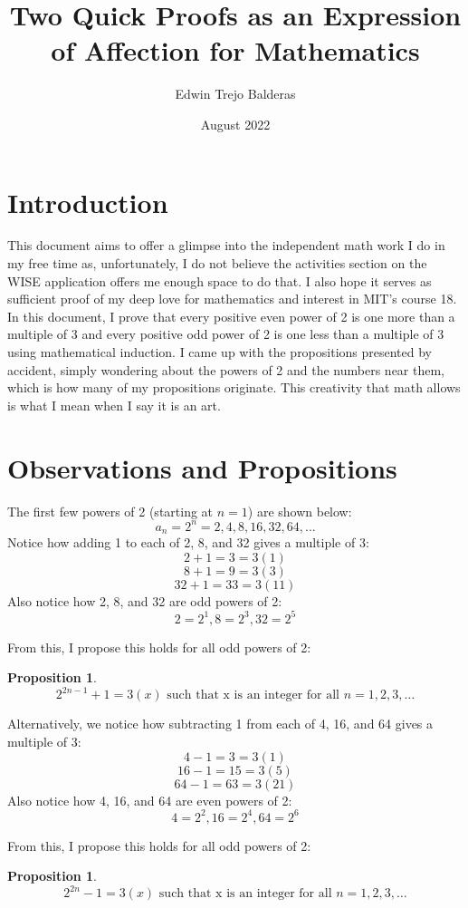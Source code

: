 \documentclass[11pt]{article}
\title{Two Quick Proofs as an Expression of Affection for Mathematics}
\author{Edwin Trejo Balderas}
\date{August 2022}
\newtheorem{proposition}[theorem]{Proposition}
\begin{document}
\maketitle

\section{Introduction}
This document aims to offer a glimpse into the independent math work I do in my free time as, unfortunately, I do not believe the activities section on the WISE application offers me enough space to do that. 
I also hope it serves as sufficient proof of my deep love for mathematics and interest in MIT's course 18.
In this document, I prove that every positive even power of 2 is one more than a multiple of 3 and every positive odd power of 2 is one less than a multiple of 3 using mathematical induction. 
I came up with the propositions presented by accident, simply wondering about the powers of 2 and the numbers near them, which is how many of my propositions originate. This creativity that math allows is what I mean when I say it is an art. 

\section{Observations and Propositions}
The first few powers of 2 (starting at \(n=1\)) are shown below:
\[a_n = 2^n = 2,4,8,16,32,64,\dots\]
Notice how adding 1 to each of 2, 8, and 32 gives a multiple of 3:
\[2 + 1 = 3 = 3(1)\]
\[8 + 1 = 9 = 3(3)\]
\[32 + 1 = 33 = 3(11)\]
Also notice how 2, 8, and 32 are odd powers of 2:
\[2 = 2^1, 8=2^3, 32=2^5\]

From this, I propose this holds for all odd powers of 2:

\begin{proposition}
    \[2^{2n-1} + 1 = 3(x) \mbox{ such that x is an integer for all } n = 1,2,3,\dots\]
\end{proposition}

Alternatively, we notice how subtracting 1 from each of 4, 16, and 64 gives a multiple of 3:
\[4 - 1 = 3 = 3(1)\]
\[16 - 1 = 15 = 3(5)\]
\[64 - 1 = 63 = 3(21)\]
Also notice how 4, 16, and 64 are even powers of 2:
\[4 = 2^2, 16=2^4, 64=2^6\]

From this, I propose this holds for all odd powers of 2:

\begin{proposition}
    \[2^{2n} - 1 = 3(x) \mbox{ such that x is an integer for all } n = 1,2,3,\dots\]
\end{proposition}
\end{document}
